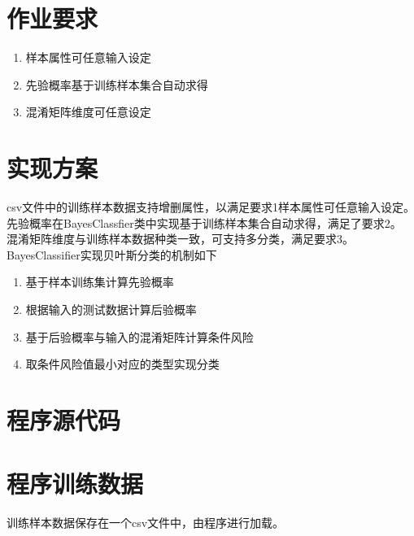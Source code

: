 \documentclass{article}
\begin{document}

\section[作业]{作业要求}

\begin{enumerate}
    \item 样本属性可任意输入设定
    \item 先验概率基于训练样本集合自动求得
    \item 混淆矩阵维度可任意设定
\end{enumerate}

\section{实现方案}
\noindent 
csv文件中的训练样本数据支持增删属性，以满足要求1样本属性可任意输入设定。\\
先验概率在BayesClassfier类中实现基于训练样本集合自动求得，满足了要求2。\\
混淆矩阵维度与训练样本数据种类一致，可支持多分类，满足要求3。\\

\noindent
BayesClassifier实现贝叶斯分类的机制如下
\begin{enumerate}
    \item 基于样本训练集计算先验概率
    \item 根据输入的测试数据计算后验概率
    \item 基于后验概率与输入的混淆矩阵计算条件风险
    \item 取条件风险值最小对应的类型实现分类
\end{enumerate}

\section{程序源代码}


\section{程序训练数据}

训练样本数据保存在一个csv文件中，由程序进行加载。
\end{document}
